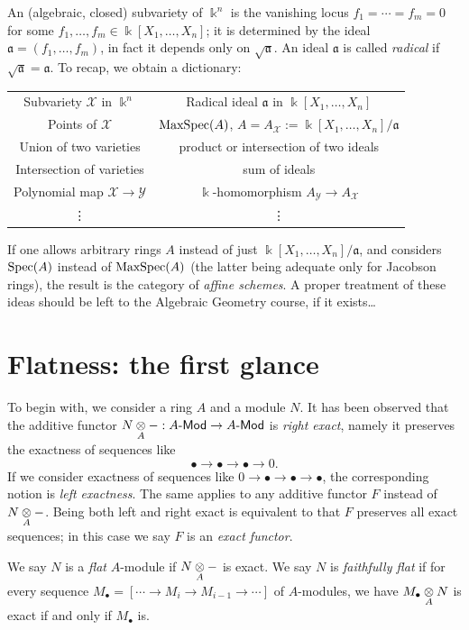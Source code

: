 An (algebraic, closed) subvariety of $\Bbbk^n$ is the vanishing locus $f_1 = \cdots = f_m = 0$ for some $f_1, \ldots, f_m \in \Bbbk[X_1, \ldots, X_n]$; it is determined by the ideal $\mathfrak{a} = (f_1, \ldots, f_m)$, in fact it depends only on $\sqrt{\mathfrak{a}}$. An ideal $\mathfrak{a}$ is called \emph{radical} if $\sqrt{\mathfrak{a}}=\mathfrak{a}$. To recap, we obtain a dictionary:
\begin{center}\begin{tabular}{c|c}
	Subvariety $\mathcal{X}$ in $\Bbbk^n$ & Radical ideal $\mathfrak{a}$ in $\Bbbk[X_1, \ldots, X_n]$ \\
	Points of $\mathcal{X}$ & $\operatorname{MaxSpec}(A)$, \;$A = A_{\mathcal{X}} := \Bbbk[X_1, \ldots, X_n]/\mathfrak{a}$ \\
	Union of two varieties & product or intersection of two ideals \\
	Intersection of varieties & sum of ideals \\
	Polynomial map $\mathcal{X} \to \mathcal{Y}$ & $\Bbbk$-homomorphism $A_{\mathcal{Y}} \to A_{\mathcal{X}}$ \\
	\vdots & \vdots
\end{tabular}\end{center}

If one allows arbitrary rings $A$ instead of just $\Bbbk[X_1, \ldots, X_n]/\mathfrak{a}$, and considers $\operatorname{Spec}(A)$ instead of $\operatorname{MaxSpec}(A)$ (the latter being adequate only for Jacobson rings), the result is the category of \emph{affine schemes}. A proper treatment of these ideas should be left to the Algebraic Geometry course, if it exists\dots

\section{Flatness: the first glance}
To begin with, we consider a ring $A$ and a module $N$. It has been observed that the additive functor $N \underset{A}{\otimes} -: A\text{-}\mathsf{Mod} \to A\text{-}\mathsf{Mod}$ is \emph{right exact}, namely it preserves the exactness of sequences like
\[ \bullet \to \bullet \to \bullet \to 0. \]
If we consider exactness of sequences like $0 \to \bullet \to \bullet \to \bullet$, the corresponding notion is \emph{left exactness}. The same applies to any additive functor $F$ instead of $N \underset{A}{\otimes} -$. Being both left and right exact is equivalent to that $F$ preserves all exact sequences; in this case we say $F$ is an \emph{exact functor}.

\begin{definition}
	We say $N$ is a \emph{flat} $A$-module if $N \underset{A}{\otimes} -$ is exact. We say $N$ is \emph{faithfully flat} if for every sequence $M_\bullet = [\cdots \to M_i \to M_{i-1} \to \cdots]$ of $A$-modules, we have $M_\bullet \underset{A}{\otimes} N$ is exact if and only if $M_\bullet$ is.
\end{definition}


